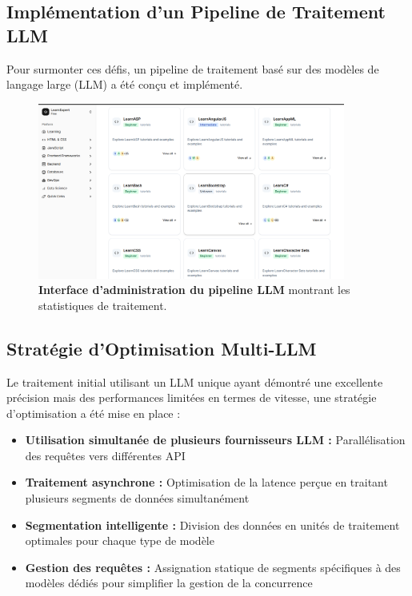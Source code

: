\subsection{Implémentation d'un Pipeline de Traitement LLM}

Pour surmonter ces défis, un pipeline de traitement basé sur des modèles de langage large (LLM) a été conçu et implémenté.

\begin{figure}[h!]
  \centering
  \includegraphics[width=0.9\textwidth,keepaspectratio]{week_3_img/Screenshot 2025-05-20 164411.png}
  \caption{\textbf{Interface d'administration du pipeline LLM} montrant les statistiques de traitement.}
  \label{fig:llm_pipeline}
\end{figure}

\subsection{Stratégie d'Optimisation Multi-LLM}

Le traitement initial utilisant un LLM unique ayant démontré une excellente précision mais des performances limitées en termes de vitesse, une stratégie d'optimisation a été mise en place :

\begin{itemize}
  \item \textbf{Utilisation simultanée de plusieurs fournisseurs LLM :} Parallélisation des requêtes vers différentes API
  \item \textbf{Traitement asynchrone :} Optimisation de la latence perçue en traitant plusieurs segments de données simultanément
  \item \textbf{Segmentation intelligente :} Division des données en unités de traitement optimales pour chaque type de modèle
  \item \textbf{Gestion des requêtes :} Assignation statique de segments spécifiques à des modèles dédiés pour simplifier la gestion de la concurrence
\end{itemize}

